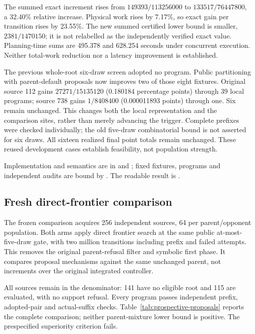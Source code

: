 The summed exact increment rises from $149393/113256000$ to
$133517/76447800$, a 32.40\% relative increase. Physical work rises by 7.17\%,
so exact gain per transition rises by 23.55\%. The new summed certified lower
bound is smaller, $2381/1470150$; it is not relabelled as the independently
verified exact value. Planning-time sums are 495.378 and 628.254 seconds under
concurrent execution. Neither total-work reduction nor a latency improvement
is established.

The previous whole-root six-draw screen adopted no program. Public
partitioning with parent-default proposals now improves two of those eight
fixtures. Original source 112 gains $27271/15135120$ (0.180184 percentage
points) through 39 local programs; source 738 gains $1/8408400$ (0.000011893
points) through one. Six remain unchanged. This changes both the local
representation and the comparison sites, rather than merely advancing the
trigger. Complete prefixes were checked individually; the old five-draw
combinatorial bound is not asserted for six draws. All sixteen realized final
point totals remain unchanged. These reused development cases establish
feasibility, not population strength.

Implementation and semantics are in  and
; fixed fixtures, programs and independent
audits are bound by . The
readable result is .

\subsection{Fresh direct-frontier comparison}
The frozen comparison acquires 256 independent sources, 64 per parent/opponent
population. Both arms apply direct frontier search at the same public
at-most-five-draw gate, with two million transitions including prefix and
failed attempts. This removes the original parent-refusal filter and symbolic
first phase. It compares proposal mechanisms against the same unchanged
parent, not increments over the original integrated controller.

All sources remain in the denominator: 141 have no eligible root and 115 are
evaluated, with no support refusal. Every program passes independent prefix,
adopted-pair and actual-suffix checks. Table~\ref{tab:prospective-proposals}
reports the complete comparison; neither parent-mixture lower bound is
positive. The prespecified superiority criterion fails.

